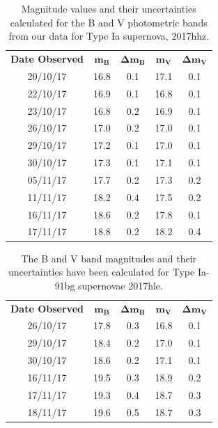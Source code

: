 \documentclass[twocolumn]{revtex4}
\begin{document}
\begin{table}[h!]
\centering
\begin{tabular}{c@{\hskip 20pt}c@{\hskip 20pt}c@{\hskip 20pt}c@{\hskip 20pt}c} 
 \hline
 \textbf{Date Observed} & \textbf{$\boldsymbol{m_B}$} & \textbf{$\boldsymbol{\Delta{m_B}}$} & \textbf{$\boldsymbol{m_V}$} & \textbf{$\boldsymbol{\Delta{m_V}}$} \\ [0.5ex] 
 20/10/17 & 16.8 & 0.1 & 17.1 & 0.1 \\
 22/10/17 & 16.9 & 0.1 & 16.8 & 0.1 \\
 23/10/17 & 16.8 & 0.2 & 16.9 & 0.1 \\
 26/10/17 & 17.0 & 0.2 & 17.0 & 0.1 \\
 29/10/17 & 17.2 & 0.1 & 17.0 & 0.1 \\
 30/10/17 & 17.3 & 0.1 & 17.1 & 0.1 \\
 05/11/17 & 17.7 & 0.2 & 17.3 & 0.2 \\
 11/11/17 & 18.2 & 0.4 & 17.5 & 0.2 \\
 16/11/17 & 18.6 & 0.2 & 17.8 & 0.1 \\
 17/11/17 & 18.8 & 0.2 & 18.2 & 0.4 \\
 \hline
\end{tabular}
\caption{Magnitude values and their uncertainties calculated for the B and V photometric bands from our data for Type Ia supernova, 2017hhz.}
\label{2017hhz-table}
\end{table}

\begin{table}[h!]
\centering
\begin{tabular}{c@{\hskip 20pt}c@{\hskip 20pt}c@{\hskip 20pt}c@{\hskip 20pt}c} 
 \hline
 \textbf{Date Observed} & \textbf{$\boldsymbol{m_B}$} & \textbf{$\boldsymbol{\Delta{m_B}}$} & \textbf{$\boldsymbol{m_V}$} & \textbf{$\boldsymbol{\Delta{m_V}}$} \\ [0.5ex] 
 26/10/17 & 17.8 & 0.3 & 16.8 & 0.1 \\
 29/10/17 & 18.4 & 0.2 & 17.0 & 0.1 \\
 30/10/17 & 18.6 & 0.2 & 17.1 & 0.1 \\
 16/11/17 & 19.5 & 0.3 & 18.9 & 0.2 \\
 17/11/17 & 19.3 & 0.4 & 18.7 & 0.3 \\
 18/11/17 & 19.6 & 0.5 & 18.7 & 0.3 \\
 \hline
\end{tabular}
\caption{The B and V band magnitudes and their uncertainties have been calculated for Type Ia-91bg supernovae 2017hle.}
\label{2017hle-table}
\end{table}
\end{document}
